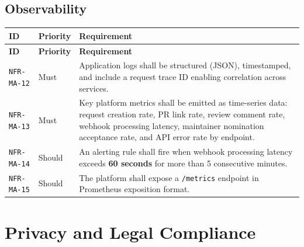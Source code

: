 \documentclass[12pt,a4paper]{article}
\begin{document}
\subsection{Observability}
\begin{longtable}{L{2.2cm} L{1.8cm} L{9.3cm}}
  \color{white}\bfseries ID & \color{white}\bfseries Priority & \color{white}\bfseries Requirement \\
  \endfirsthead
  \color{white}\bfseries ID & \color{white}\bfseries Priority & \color{white}\bfseries Requirement \\
  \endhead\hline
  \texttt{NFR-MA-12} & Must   & Application logs shall be structured (JSON), timestamped, and include a request trace ID enabling correlation across services. \\
  \texttt{NFR-MA-13} & Must   & Key platform metrics shall be emitted as time-series data: request creation rate, PR link rate, review comment rate, webhook processing latency, maintainer nomination acceptance rate, and API error rate by endpoint. \\
  \texttt{NFR-MA-14} & Should & An alerting rule shall fire when webhook processing latency exceeds \textbf{60 seconds} for more than 5 consecutive minutes. \\
  \texttt{NFR-MA-15} & Should & The platform shall expose a \texttt{/metrics} endpoint in Prometheus exposition format. \\
  \hline
\end{longtable}

\section{Privacy and Legal Compliance}
\end{document}
